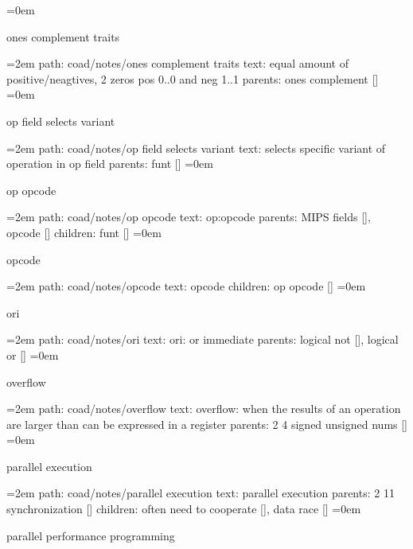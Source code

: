 \smallskip
\leftskip=0em
\par\endgroup
\bigskip
{}
ones complement traits
\smallskip
\par\begingroup
\leftskip=2em
path: coad/notes/ones complement traits
\smallskip
text:  equal amount of positive/neagtives, 2 zeros pos 0..0 and neg 1..1
\smallskip
parents:  ones complement []
\smallskip
\leftskip=0em
\par\endgroup
\bigskip
{}
op field selects variant
\smallskip
\par\begingroup
\leftskip=2em
path: coad/notes/op field selects variant
\smallskip
text:  selects specific variant of operation in op field
\smallskip
parents:  funt []
\smallskip
\leftskip=0em
\par\endgroup
\bigskip
{}
op opcode
\smallskip
\par\begingroup
\leftskip=2em
path: coad/notes/op opcode
\smallskip
text:  op:opcode
\smallskip
parents:  MIPS fields [], opcode []
\smallskip
children: funt []
\smallskip
\leftskip=0em
\par\endgroup
\bigskip
{}
opcode
\smallskip
\par\begingroup
\leftskip=2em
path: coad/notes/opcode
\smallskip
text:  opcode
\smallskip
children: op opcode []
\smallskip
\leftskip=0em
\par\endgroup
\bigskip
{}
ori
\smallskip
\par\begingroup
\leftskip=2em
path: coad/notes/ori
\smallskip
text:  ori: or immediate
\smallskip
parents:  logical not [], logical or []
\smallskip
\leftskip=0em
\par\endgroup
\bigskip
{}
overflow
\smallskip
\par\begingroup
\leftskip=2em
path: coad/notes/overflow
\smallskip
text:  overflow: when the results of an operation are larger than can be expressed in a register
\smallskip
parents:  2 4 signed unsigned nums []
\smallskip
\leftskip=0em
\par\endgroup
\bigskip
{}
parallel execution
\smallskip
\par\begingroup
\leftskip=2em
path: coad/notes/parallel execution
\smallskip
text:  parallel execution
\smallskip
parents:  2 11 synchronization []
\smallskip
children: often need to cooperate [], data race []
\smallskip
\leftskip=0em
\par\endgroup
\bigskip
{}
parallel performance programming
